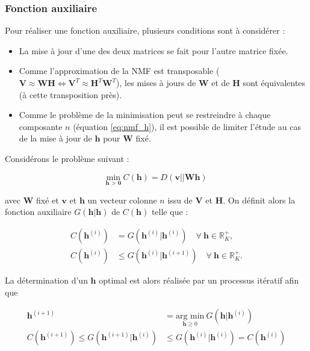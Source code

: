 \subsubsection{Fonction auxiliaire}\label{part:sub_fonction_aux}
Pour réaliser une fonction auxiliaire, plusieurs conditions sont à considérer :

\begin{itemize}
\item La mise à jour d'une des deux matrices se fait pour l'autre matrice fixée.
\item Comme l'approximation de la NMF est transposable ($\mathbf{V} \approx \mathbf{WH} \Leftrightarrow \mathbf{V}^T \approx \mathbf{H}^T \mathbf{W}^T$), les mises à jours de $\mathbf{W}$ et de $\mathbf{H}$ sont équivalentes (à cette transposition près).
\item Comme le problème de la minimisation peut se restreindre à chaque composante $n$ (équation \ref{eq:nmf_h}), il est possible de limiter l'étude au cas de la mise à jour de $\mathbf{h}$ pour $\mathbf{W}$ fixé.
\end{itemize}

Considérons le problème suivant :

\begin{equation}\label{eq:costFunctionMM}
\underset{\textbf{h > 0}}{\text{min}}~C(\mathbf{h}) = D(\mathbf{v} \vert\vert \mathbf{Wh})
\end{equation}

avec $\mathbf{W}$ fixé et $\mathbf{v}$ et $\mathbf{h}$ un vecteur colonne $n$ issu de $\mathbf{V}$ et $ \mathbf{H}$. On définit alors la fonction auxiliaire $G(\mathbf{h}\vert \mathbf{h})$ de $C(\mathbf{h})$ telle que :

\begin{subequations}\label{eqs:conditionAux}
\begin{align}
C(\mathbf{h}^{\left(i\right)}) &= G(\mathbf{h}^{(i)}\vert \mathbf{h}^{(i)}) \quad \forall~\mathbf{h} \in \mathbb{R}^+_K,\\
C(\mathbf{h}^{(i)}) &\leq G(\mathbf{h}^{(i)} \vert \mathbf{h}^{(i+1)}) \quad \forall~\mathbf{h} \in \mathbb{R}^+_K.
\end{align}
\end{subequations}

La détermination d'un $\mathbf{h}$ optimal est alors réalisée par un processus itératif afin que

\begin{subequations}\label{eqs:conditionAux}
\begin{align}
\textbf{h}^{(i+1)} &= \underset{\textbf{h} \geq 0}{\text{arg min}}~ G(\textbf{h}\vert \textbf{h}^{(i)})\\
C(\mathbf{h}^{(i+1)}) \leq G(\textbf{h}^{(i+1)}\vert\mathbf{h}^{(i)}) &\leq G(\textbf{h}^{(i)}\vert\mathbf{h}^{(i)}) = C(\mathbf{h}^{(i)})\label{eq:monotonie}
\end{align}
\end{subequations}

